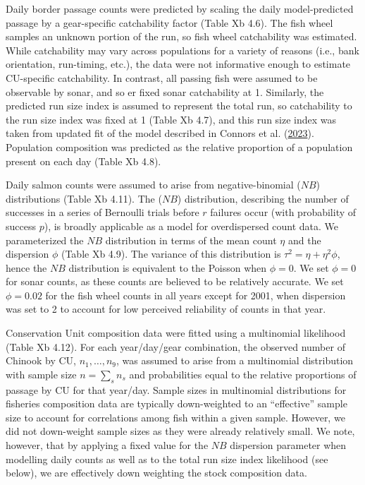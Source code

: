 \documentclass[11pt]{book}
\begin{document}
Daily border passage counts were predicted by scaling the daily model-predicted passage by a gear-specific catchability factor (Table Xb 4.6). The fish wheel samples an unknown portion of the run, so fish wheel catchability was estimated. While catchability may vary across populations for a variety of reasons (i.e., bank orientation, run-timing, etc.), the data were not informative enough to estimate CU-specific catchability. In contrast, all passing fish were assumed to be observable by sonar, and so er fixed sonar catchability at 1. Similarly, the predicted run size index is assumed to represent the total run, so catchability to the run size index was fixed at 1 (Table Xb 4.7), and this run size index was taken from updated fit of the model described in Connors et al. (\protect\hyperlink{ref-connors_estimates_2023}{2023}). Population composition was predicted as the relative proportion of a population present on each day (Table Xb 4.8).

Daily salmon counts were assumed to arise from negative-binomial (\(NB\)) distributions (Table Xb 4.11). The (\(NB\)) distribution, describing the number of successes in a series of Bernoulli trials before \(r\) failures occur (with probability of success \(p\)), is broadly applicable as a model for overdispersed count data. We parameterized the \(NB\) distribution in terms of the mean count \(\eta\) and the dispersion \(\phi\) (Table Xb 4.9). The variance of this distribution is \(\tau^2=\eta+\eta^2\phi\), hence the \(NB\) distribution is equivalent to the Poisson when \(\phi=0\). We set \(\phi=0\) for sonar counts, as these counts are believed to be relatively accurate. We set \(\phi=0.02\) for the fish wheel counts in all years except for 2001, when dispersion was set to 2 to account for low perceived reliability of counts in that year.

Conservation Unit composition data were fitted using a multinomial likelihood (Table Xb 4.12). For each year/day/gear combination, the observed number of Chinook by CU, \(n_1,…,n_9\), was assumed to arise from a multinomial distribution with sample size \(n=\sum_sn_s\) and probabilities equal to the relative proportions of passage by CU for that year/day. Sample sizes in multinomial distributions for fisheries composition data are typically down-weighted to an ``effective'' sample size to account for correlations among fish within a given sample. However, we did not down-weight sample sizes as they were already relatively small. We note, however, that by applying a fixed value for the \(NB\) dispersion parameter when modelling daily counts as well as to the total run size index likelihood (see below), we are effectively down weighting the stock composition data.
\end{document}
